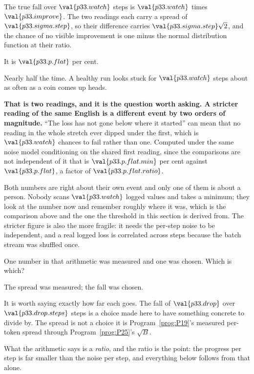 \begin{fr}
\begin{ansblock}
The true fall over $\val{p33.watch}$ steps is $\val{p33.watch}$ times
$\val{p33.improve}$. The two readings each carry a spread of
$\val{p33.sigma.step}$, so their difference carries
$\val{p33.sigma.step}\sqrt{2}$, and the chance of no visible improvement is
one minus the normal distribution function at their ratio.

It is $\val{p33.p.flat}$ per cent.
\end{ansblock}

Nearly half the time. A healthy run looks stuck for $\val{p33.watch}$ steps
about as often as a coin comes up heads.

\begin{note}
\textbf{That is two readings, and it is the question worth asking. A stricter
reading of the same English is a different event by two orders of magnitude.}
\enquote{The loss has not gone below where it started} can mean that no
reading in the whole stretch ever dipped under the first, which is
$\val{p33.watch}$ chances to fail rather than one. Computed under the same
noise model \dash{} conditioning on the shared first reading, since the
comparisons are not independent of it \dash{} that is
$\val{p33.p.flat.min}$ per cent against $\val{p33.p.flat}$, a factor of
$\val{p33.p.flat.ratio}$.

Both numbers are right about their own event and only one of them is about a
person. Nobody scans $\val{p33.watch}$ logged values and takes a minimum; they
look at the number now and remember roughly where it was, which is the
comparison above and the one the threshold in this section is derived from. The
stricter figure is also the more fragile: it needs the per-step noise to be
independent, and a real logged loss is correlated across steps because the
batch stream was shuffled once.
\end{note}

One number in that arithmetic was measured and one was chosen. Which is
which?
\dotline
\nextframe
\end{fr}

\begin{fr}
\begin{ansblock}
The spread was measured; the fall was chosen.
\end{ansblock}

It is worth saying exactly how far each goes. The fall of $\val{p33.drop}$ over $\val{p33.drop.steps}$ steps is a
choice made here to have something concrete to divide by. The spread is not
a choice \dash{} it is Program~\ref{prog:P19}'s measured per-token spread
through Program~\ref{prog:P25}'s $\sqrt{B}$.

What the arithmetic says is a \emph{ratio}, and the ratio is the point: the
progress per step is far smaller than the noise per step, and everything
below follows from that alone.
\end{fr}

